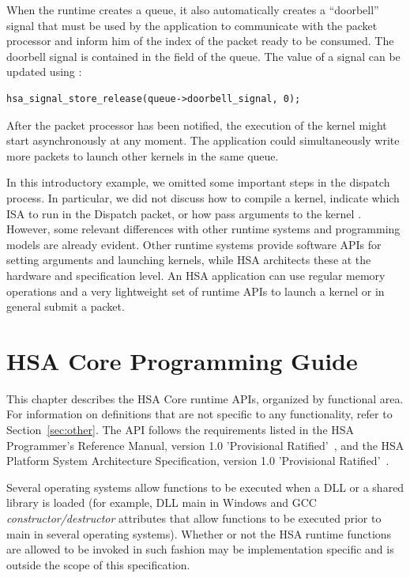 \documentclass[final]{book}
\begin{document}
When the runtime creates a queue, it also automatically creates a ``doorbell''
signal that must be used by the application to communicate with the packet
processor and inform him of the index of the packet ready to be consumed. The
doorbell signal is contained in the  field
of the queue. The value of a signal can be updated using
:

\begin{lstlisting}
hsa_signal_store_release(queue->doorbell_signal, 0);
\end{lstlisting}

After the packet processor has been notified, the execution of the kernel might
start asynchronously at any moment. The application could simultaneously write
more packets to launch other kernels in the same queue.

In this introductory example, we omitted some important steps in the dispatch
process. In particular, we did not discuss how to compile a kernel, indicate
which ISA to run in the Dispatch packet, or how pass arguments to the kernel
. However, some relevant differences with other runtime systems and programming
models are already evident.  Other runtime systems provide software APIs for
setting arguments and launching kernels, while HSA architects these at the
hardware and specification level. An HSA application can use regular memory
operations and a very lightweight set of runtime APIs to launch a kernel or in
general submit a packet.


\chapter{HSA Core Programming Guide} \label{coreapi}

This chapter describes the HSA Core runtime APIs, organized by functional
area. For information on definitions that are not specific to any functionality,
refer to Section~\ref{sec:other}. The API follows the requirements listed in the
HSA Programmer's Reference Manual, version 1.0 'Provisional
Ratified'~\cite{prm}, and the HSA Platform System Architecture Specification,
version 1.0 'Provisional Ratified'~\cite{sar}.

Several operating systems allow functions to be executed when a DLL or a shared
library is loaded (for example, DLL main in Windows and GCC
\emph{constructor/destructor} attributes that allow functions to be executed
prior to main in several operating systems). Whether or not the HSA runtime
functions are allowed to be invoked in such fashion may be implementation
specific and is outside the scope of this specification.
\end{document}
